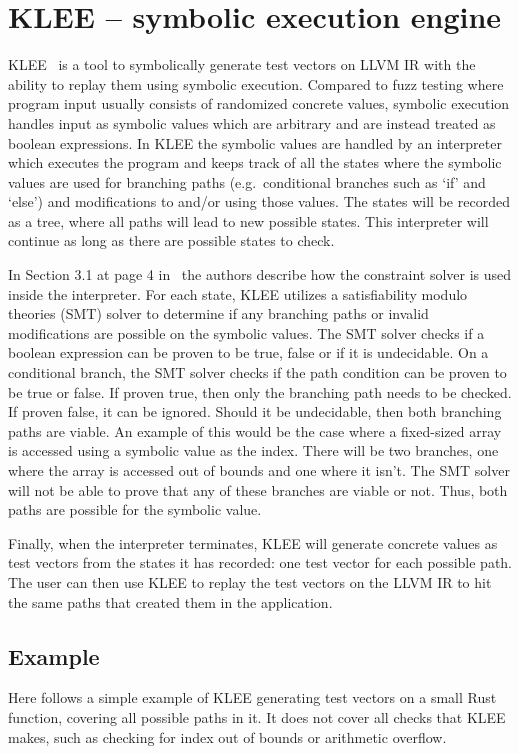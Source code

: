 \section{KLEE -- symbolic execution engine}
KLEE~\cite{kleepaper} is a tool to symbolically generate test vectors on LLVM IR with the
ability to replay them using symbolic execution. Compared to fuzz testing
where program input usually consists of randomized concrete values, symbolic
execution handles input as symbolic values which are arbitrary and are instead
treated as boolean expressions. In KLEE the symbolic values are handled by an
interpreter which executes the program and keeps track of all the states where
the symbolic values are used for branching paths (e.g.\ conditional branches
such as `if' and `else') and modifications to and/or using those values. The
states will be recorded as a tree, where all paths will lead to new possible
states.  This interpreter will continue as long as there are possible states to
check.

In Section 3.1 at page 4 in~\cite{kleepaper} the authors describe how the
constraint solver is used inside the interpreter. For each state, KLEE utilizes
a satisfiability modulo theories (SMT) solver to determine if any branching
paths or invalid modifications are possible on the symbolic values. The SMT
solver checks if a boolean expression can be proven to be true, false or if it
is undecidable. On a conditional branch, the SMT solver checks if the path
condition can be proven to be true or false. If proven true, then only the
branching path needs to be checked. If proven false, it can be ignored. Should
it be undecidable, then both branching paths are viable. An example of this
would be the case where a fixed-sized array is accessed using a symbolic value
as the index. There will be two branches, one where the array is accessed out
of bounds and one where it isn't. The SMT solver will not be able to prove that
any of these branches are viable or not. Thus, both paths are possible for the
symbolic value.

Finally, when the interpreter terminates, KLEE will generate concrete values as
test vectors from the states it has recorded: one test vector for each possible
path. The user can then use KLEE to replay the test vectors on the LLVM IR to hit
the same paths that created them in the application.

\subsection{Example}
Here follows a simple example of KLEE generating test vectors on a small Rust
function, covering all possible paths in it. It does not cover all checks that
KLEE makes, such as checking for index out of bounds or arithmetic overflow.

